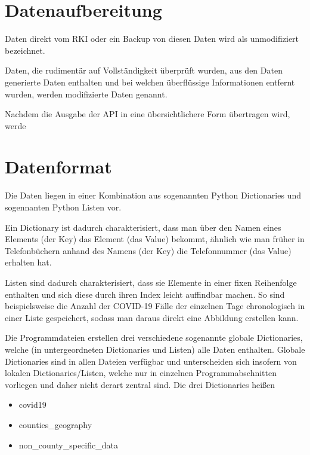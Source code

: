 \section{Datenaufbereitung}
Daten direkt vom RKI oder ein Backup von diesen Daten wird als \glqq{}unmodifiziert\grqq{} bezeichnet. 

Daten, die rudimentär auf Vollständigkeit überprüft wurden, aus den Daten generierte Daten enthalten und bei welchen überflüssige Informationen entfernt wurden, werden \glqq{}modifizierte\grqq{} Daten genannt.

Nachdem die Ausgabe der API in eine übersichtlichere Form übertragen wird, werde



\section{Datenformat}
Die Daten liegen in einer Kombination aus sogenannten Python Dictionaries und sogennanten Python Listen vor.

Ein Dictionary ist dadurch charakterisiert, dass man über den Namen eines Elements (der \glqq{}Key\grqq{}) das Element (das \glqq{}Value\grqq{})  bekommt, ähnlich wie man früher in Telefonbüchern anhand des Namens (der Key) die Telefonnummer (das Value) erhalten hat.

Listen sind dadurch charakterisiert, dass sie Elemente in einer fixen Reihenfolge enthalten und sich diese durch ihren Index leicht auffindbar machen. So sind beispielsweise die Anzahl der COVID-19 Fälle der einzelnen Tage chronologisch in einer Liste gespeichert, sodass man daraus direkt eine Abbildung erstellen kann.


Die Programmdateien erstellen drei verschiedene sogenannte globale Dictionaries, welche (in untergeordneten Dictionaries und Listen) alle Daten enthalten. Globale Dictionaries sind in allen Dateien verfügbar und unterscheiden sich insofern von lokalen Dictionaries/Listen, welche nur in einzelnen Programmabschnitten vorliegen und daher nicht derart zentral sind.
Die drei Dictionaries heißen
\begin{itemize}
    \item covid19
    \item counties\_geography
    \item non\_county\_specific\_data
\end{itemize}

